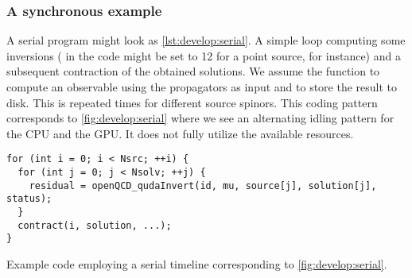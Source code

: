 %   

\subsubsection{A synchronous example}

A serial program might look as \cref{lst:develop:serial}.
A simple loop computing some inversions ( in the code might be set to \num{12} for a point source, for instance) and a subsequent contraction of the obtained solutions.
We assume the  function to compute an observable using the propagators as input and to store the result to disk.
This is repeated  times for different source spinors.
This coding pattern corresponds to \cref{fig:develop:serial} where we see an alternating idling pattern for the CPU and the GPU.
It does not fully utilize the available resources.
\begin{codelisting}
\begin{verbatim}
for (int i = 0; i < Nsrc; ++i) {
  for (int j = 0; j < Nsolv; ++j) {
    residual = openQCD_qudaInvert(id, mu, source[j], solution[j], status);
  }
  contract(i, solution, ...);
}
\end{verbatim}
\caption{Example code employing a serial timeline corresponding to \cref{fig:develop:serial}.}
\label{lst:develop:serial}
\end{codelisting}


